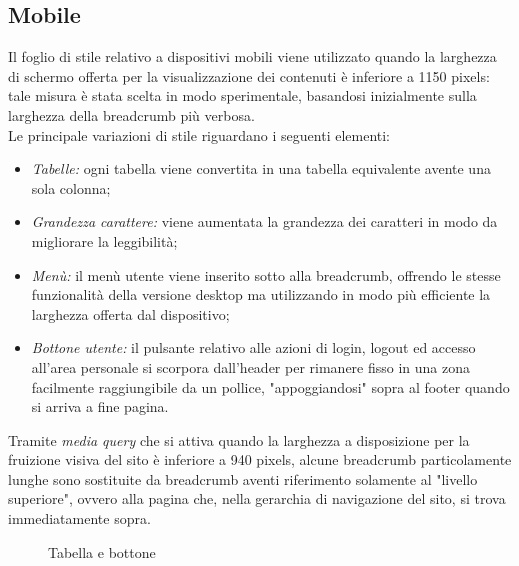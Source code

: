 \documentclass[]{article}
\begin{document}
\subsection{Mobile}
Il foglio di stile relativo a dispositivi mobili viene utilizzato quando la larghezza di schermo offerta per la visualizzazione dei contenuti è inferiore a 1150 pixels: tale misura è stata scelta in modo sperimentale, basandosi inizialmente sulla larghezza della breadcrumb più verbosa.\\
Le principale variazioni di stile riguardano i seguenti elementi:
\begin{itemize}
	\item \textit{Tabelle:} ogni tabella viene convertita in una tabella equivalente avente una sola colonna;
	\item \textit{Grandezza carattere:} viene aumentata la grandezza dei caratteri in modo da migliorare la leggibilità;
	\item \textit{Menù:} il menù utente viene inserito sotto alla breadcrumb, offrendo le stesse funzionalità della versione desktop ma utilizzando in modo più efficiente la larghezza offerta dal dispositivo;
	\item \textit{Bottone utente:} il pulsante relativo alle azioni di login, logout ed accesso all'area personale si scorpora dall'header per rimanere fisso in una zona facilmente raggiungibile da un pollice, "appoggiandosi" sopra al footer quando si arriva a fine pagina.
\end{itemize}
Tramite \textit{media query} che si attiva quando la larghezza a disposizione per la fruizione visiva del sito è inferiore a 940 pixels, alcune breadcrumb particolamente lunghe sono sostituite da breadcrumb aventi riferimento solamente al "livello superiore", ovvero alla pagina che, nella gerarchia di navigazione del sito, si trova immediatamente sopra.
\begin{figure}[H]
	\centering
	\caption{Tabella e bottone}
\end{figure}
\end{document}
